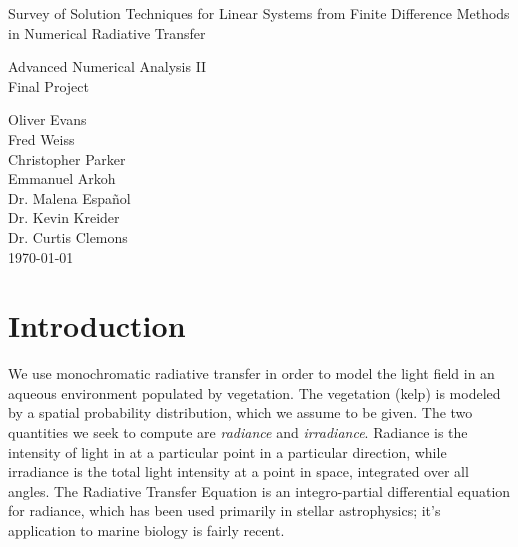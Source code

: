 \documentclass[10pt]{article}
\begin{document}
\null

\thispagestyle{empty}
\addtocounter{page}{-1}

\begin{center}
    \begin{sffamily}
	\begin{bfseries}
	    \null
	    \vfill
		\Huge{Survey of Solution Techniques for Linear Systems from Finite Difference Methods in Numerical Radiative Transfer}

	    \vspace{20pt}
	    \LARGE{Advanced Numerical Analysis II} \\
		\LARGE{Final Project} \\
	    \vspace{20pt}
    \begin{Large}
		Oliver Evans \\
		Fred Weiss \\
		Christopher Parker \\
		Emmanuel Arkoh \\[1em]

		Dr. Malena Espa\~nol \\
		Dr. Kevin Kreider \\
		Dr. Curtis Clemons \\
	\vspace{20pt}
	\today
    \end{Large}
	\end{bfseries}
    \end{sffamily}
    \vspace{30pt}

    \null
    \vfill
    \vfill
    \null
\end{center}
\pagebreak


\renewcommand{\arraystretch}{1.5}


\section{Introduction}

We use monochromatic radiative transfer in order to model the light field in an aqueous environment populated by vegetation.
The vegetation (kelp) is modeled by a spatial probability distribution, which we assume to be given.
The two quantities we seek to compute are \textit{radiance} and \textit{irradiance}.
Radiance is the intensity of light in at a particular point in a particular direction, while irradiance is the total light intensity at a point in space, integrated over all angles.
The Radiative Transfer Equation is an integro-partial differential equation for radiance, which has been used primarily in stellar astrophysics; it's application to marine biology is fairly recent.
\end{document}
